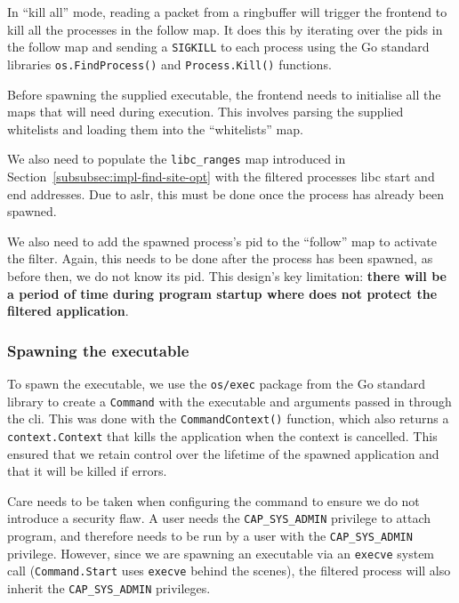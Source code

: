 In ``kill all'' mode, reading a packet from a ringbuffer will trigger
the frontend to kill all the processes in the follow map. It does this by
iterating over the \acp{pid} in the follow map and sending a \texttt{SIGKILL} to
each process using the Go standard libraries \texttt{os.FindProcess()} and
\texttt{Process.Kill()} functions.

Before spawning the supplied executable, the frontend needs to initialise all
the maps that \af will need during execution. This involves parsing the
supplied whitelists and loading them into the ``whitelists'' map. 

We also need to populate the \texttt{libc\_ranges} map introduced in
Section~\ref{subsubsec:impl-find-site-opt} with the filtered processes \ac{libc}
start and end addresses. Due to \ac{aslr}, this must be done once the process
has already been spawned. 

We also need to add the spawned process's \ac{pid} to the ``follow'' map to
activate the filter. Again, this needs to be done after the process has been
spawned, as before then, we do not know its \ac{pid}. This design's key limitation: \textbf{there will be a period of time during program startup where \af 
does not protect the filtered application}.

\subsubsection{Spawning the executable} \label{subsubsec:spawning-exec}

To spawn the executable, we use the \texttt{os/exec} package from the Go
standard library to create a \texttt{Command} with the executable and arguments
passed in through the \ac{cli}. This was done with the \texttt{CommandContext()}
function, which also returns a \texttt{context.Context} that kills the
application when the context is cancelled. This ensured that we retain control
over the lifetime of the spawned application and that it will be killed if \af
errors.

Care needs to be taken when configuring the command to ensure we do not 
introduce a security flaw. A user needs the \texttt{CAP\_SYS\_ADMIN} privilege
to attach  program, and therefore \af needs to be run by a user with
the \texttt{CAP\_SYS\_ADMIN} privilege. However, since we are spawning an
executable via an \texttt{execve} system call (\texttt{Command.Start} uses
\texttt{execve} behind the scenes), the filtered process will also inherit the
\texttt{CAP\_SYS\_ADMIN} privileges.

